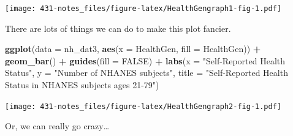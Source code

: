 \documentclass[
]{book}
\newenvironment{Shaded}{\begin{snugshade}}{\end{snugshade}}
\newcommand{\DataTypeTok}[1]{\textcolor[rgb]{0.13,0.29,0.53}{#1}}
\newcommand{\KeywordTok}[1]{\textcolor[rgb]{0.13,0.29,0.53}{\textbf{#1}}}
\newcommand{\NormalTok}[1]{#1}
\newcommand{\OperatorTok}[1]{\textcolor[rgb]{0.81,0.36,0.00}{\textbf{#1}}}
\newcommand{\OtherTok}[1]{\textcolor[rgb]{0.56,0.35,0.01}{#1}}
\newcommand{\StringTok}[1]{\textcolor[rgb]{0.31,0.60,0.02}{#1}}
\begin{document}
\texttt{[image: 431-notes\_files/figure-latex/HealthGengraph1-fig-1.pdf]}

There are lots of things we can do to make this plot fancier.

\begin{Shaded}
\begin{Highlighting}[]
\KeywordTok{ggplot}\NormalTok{(}\DataTypeTok{data =}\NormalTok{ nh_dat3, }\KeywordTok{aes}\NormalTok{(}\DataTypeTok{x =}\NormalTok{ HealthGen, }\DataTypeTok{fill =}\NormalTok{ HealthGen)) }\OperatorTok{+}\StringTok{ }
\StringTok{    }\KeywordTok{geom_bar}\NormalTok{() }\OperatorTok{+}\StringTok{ }
\StringTok{    }\KeywordTok{guides}\NormalTok{(}\DataTypeTok{fill =} \OtherTok{FALSE}\NormalTok{) }\OperatorTok{+}
\StringTok{    }\KeywordTok{labs}\NormalTok{(}\DataTypeTok{x =} \StringTok{"Self-Reported Health Status"}\NormalTok{,}
         \DataTypeTok{y =} \StringTok{"Number of NHANES subjects"}\NormalTok{,}
         \DataTypeTok{title =} \StringTok{"Self-Reported Health Status in NHANES subjects ages 21-79"}\NormalTok{)}
\end{Highlighting}
\end{Shaded}

\texttt{[image: 431-notes\_files/figure-latex/HealthGengraph2-fig-1.pdf]}

Or, we can really go crazy\ldots{}
\end{document}
